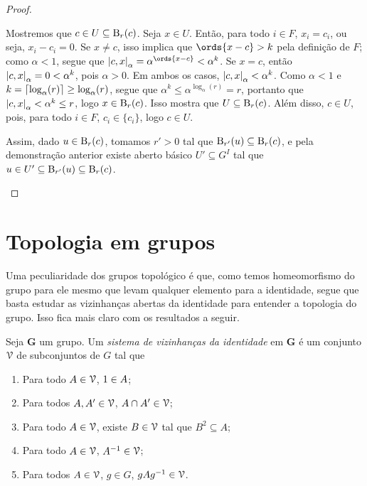 \begin{proof}
\begin{itemize}
	Mostremos que $c \in U \subseteq \mathrm{B}_r(c)$. Seja $x \in U$. Então, para todo $i \in F$, $x_i=c_i$, ou seja, $x_i-c_i=0$. Se $x \neq c$, isso implica que $\ords{x-c} > k$ pela definição de $F$; como $\alpha < 1$, segue que $\dist{c}{x}_\alpha = \alpha^{\ords{x-c}} < \alpha^k$. Se $x=c$, então $\left\vert{c},{x}\right\vert_\alpha = 0 < \alpha^k$, pois $\alpha > 0$. Em ambos os casos, $\left\vert{c},{x}\right\vert_\alpha < \alpha^k$. Como $\alpha < 1$ e $k = \left\lceil{\log_{\alpha}(r)}\right\rceil \geq \log_{\alpha}(r)$, segue que $\alpha^k \leq \alpha^{\log_{\alpha}(r)} = r$, portanto que $\left\vert{c},{x}\right\vert_\alpha < \alpha^k \leq r$, logo $x \in \mathrm{B}_r(c)$. Isso mostra que $U \subseteq \mathrm{B}_r(c)$. Além disso, $c \in U$, pois, para todo $i \in F$, $c_i \in \{c_i\}$, logo $c \in U$.

	Assim, dado $u \in \mathrm{B}_r(c)$, tomamos $r'>0$ tal que $\mathrm{B}_{r'}(u) \subseteq \mathrm{B}_r(c)$, e pela demonstração anterior existe aberto básico $U' \subseteq G^{I}$ tal que $u \in U' \subseteq \mathrm{B}_{r'}(u) \subseteq \mathrm{B}_r(c)$.
	\end{itemize}
\end{proof}


\section{Topologia em grupos}

Uma peculiaridade dos grupos topológico é que, como temos homeomorfismo do grupo para ele mesmo que levam qualquer elemento para a identidade, segue que basta estudar as vizinhanças abertas da identidade para entender a topologia do grupo. Isso fica mais claro com os resultados a seguir.

\begin{definition}
Seja $\bm G$ um grupo. Um \emph{sistema de vizinhanças da identidade} em $\bm G$ é um conjunto $\mathcal{V}$ de subconjuntos de $G$ tal que
	\begin{enumerate}
	\item Para todo $A \in \mathcal{V}$, $1 \in A$;
	\item Para todos $A,A' \in \mathcal{V}$, $A \cap A' \in \mathcal{V}$;
	\item Para todo $A \in \mathcal{V}$, existe $B \in \mathcal{V}$ tal que $B^2 \subseteq A$;
	\item	 Para todo $A \in \mathcal{V}$, $A^{-1} \in \mathcal{V}$;
	\item Para todos $A \in \mathcal{V}$, $g \in G$, $gAg^{-1} \in \mathcal{V}$.	
	\end{enumerate}
\end{definition}

